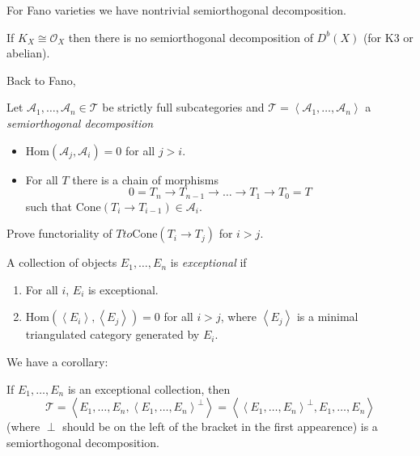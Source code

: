 For Fano varieties we have nontrivial semiorthogonal decomposition.

\begin{remark}
\label{remark-CY-have-no-semiorthogonal-decomposition}
If $K_X \cong \mathcal{O}_X$ then there is no semiorthogonal decomposition of
$D^b(X)$ (for K3 or abelian).
\end{remark}

Back to Fano,
\begin{definition}
\label{definition-semiorthogonal-decomposition-for-several-categories}
Let $\mathcal{A}_1,\ldots,\mathcal{A}_n \in \mathcal{T}$ be strictly full
subcategories and $\mathcal{T}=\left<\mathcal{A}_1,\ldots,\mathcal{A}_n\right>$ 
a {\it semiorthogonal decomposition}
\begin{itemize}
\item $\text{Hom}(\mathcal{A}_j,\mathcal{A}_i)=0$ for all $j>i$.
 \item For all $T$ there is a chain of morphisms
 $$
0 = T_n \to T_{n-1}\to \ldots \to T_1 \to T_0=T
$$
such that $\text{Cone}(T_i \to T_{i-1}) \in \mathcal{A}_i$.
\end{itemize}
\end{definition}

\begin{exercise}
\label{exercise-functoriality-and-cone}
Prove functoriality of $T to \text{Cone}(T_i \to T_j)$ for $i>j$.
\end{exercise}

\begin{definition}
\label{definition-exceptional-collection-of-objects}
A collection of objects $E_1,\ldots, E_n$ is {\it exceptional} if
 \begin{enumerate}
\item For all $i$, $E_i$ is exceptional.
\item $\text{Hom}(\left<E_i\right>,\left<E_j\right>)=0$ for all $i>j$, where
$\left<E_j\right>$ is a minimal triangulated category generated by $E_i$.
\end{enumerate}
\end{definition}

We have a corollary:

\begin{lemma}
\label{lemma-exceptional-collection-gives-semiorthogonal-decomposition}
If $E_1,\ldots,E_n$ is an exceptional collection, then
$$
\mathcal{T}=\left<E_1,\ldots,E_n,\left<E_1,\ldots,E_n\right>^\perp\right>
=\left<\left<E_1,\ldots,E_n\right>^\perp,E_1,\ldots,E_n\right>
$$
(where $\perp$ should be on the left of the bracket in the first appearence) 
is a semiorthogonal decomposition.
\end{lemma}

